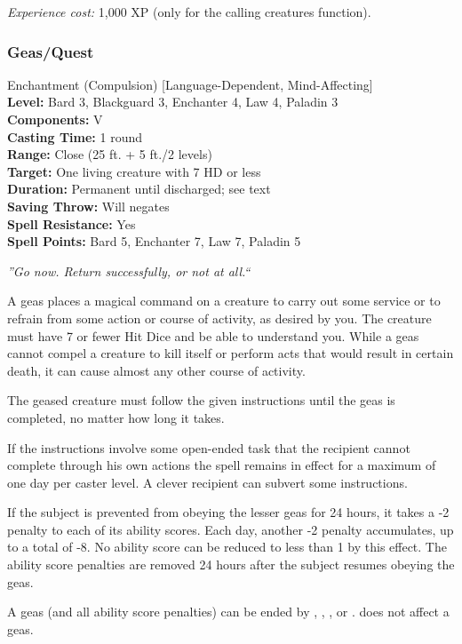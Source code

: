 \emph{Experience cost:} 1,000 XP (only for the calling creatures function). 
\subsubsection{Geas/Quest}
\label{Spell:GeasQuest}
Enchantment (Compulsion) [Language-Dependent, Mind-Affecting]
\\ \textbf{Level:} Bard 3, Blackguard 3, Enchanter 4, Law 4, Paladin 3
\\ \textbf{Components:} V
\\ \textbf{Casting Time:} 1 round
\\ \textbf{Range:} Close (25 ft. + 5 ft./2 levels)
\\ \textbf{Target:} One living creature with 7 HD or less
\\ \textbf{Duration:} Permanent until discharged; see text
\\ \textbf{Saving Throw:} Will negates
\\ \textbf{Spell Resistance:} Yes
\\ \textbf{Spell Points:} Bard 5, Enchanter 7, Law 7, Paladin 5

\emph{''Go now. Return successfully, or not at all.``}

A geas places a magical command on a creature to carry out some service or to refrain from some action or course of activity, 
as desired by you. The creature must have 7 or fewer Hit Dice and be able to understand you. 
While a geas cannot compel a creature to kill itself or perform acts that would result in certain death, 
it can cause almost any other course of activity.

The geased creature must follow the given instructions until the geas is completed, no matter how long it takes.

If the instructions involve some open-ended task that the recipient cannot complete through his own actions the spell 
remains in effect for a maximum of one day per caster level. A clever recipient can subvert some instructions.

If the subject is prevented from obeying the lesser geas for 24 hours, 
it takes a -2 penalty to each of its ability scores. 
Each day, another -2 penalty accumulates, up to a total of -8. 
No ability score can be reduced to less than 1 by this effect. 
The ability score penalties are removed 24 hours after the subject resumes obeying the geas.

A geas (and all ability score penalties) can be ended by 
, , , or .  does not affect a geas.


